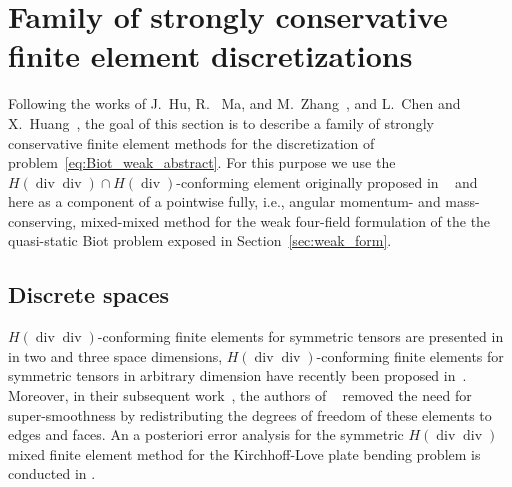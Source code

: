 \documentclass[11pt]{amsart}
\theoremstyle{remark}
\theoremstyle{definition}
\renewcommand{\div}{\operatorname{div}}
\renewcommand{\div}{\operatorname{div}}
\begin{document}
\section{Family of strongly conservative finite element discretizations}\label{sec:fem} 
Following the works of J.~Hu, R.~ Ma, and M.~Zhang~\cite{HuMaZhang2021}, and L.~Chen and X.~Huang~\cite{ChenHuang2022}, the goal of this section is to describe a family of strongly
conservative finite element methods for the discretization of problem~\eqref{eq:Biot_weak_abstract}.
For this purpose we use the $H(\div \div) \cap H(\div)$-conforming element originally proposed in ~\cite{HuMaZhang2021}
and ~\cite{ChenHuang2022} here as a component of a pointwise fully, i.e., angular momentum- and mass-conserving,
mixed-mixed method for the weak four-field formulation of the the quasi-static Biot problem exposed in Section~\ref{sec:weak_form}.

\subsection{Discrete spaces}\label{subsec:discret_spaces} 
$H(\div\div)$-conforming finite elements for symmetric tensors are presented in~\cite{chen2020finite, HuMaZhang2021, chen2022finite} in two and three space dimensions, $H(\div \div)$-conforming finite elements for symmetric tensors in arbitrary dimension have recently been proposed in~\cite{ChenHuang2022}. 
Moreover, in their subsequent work~\cite{chen2025new}, the authors of  ~\cite{ChenHuang2022} removed the need for super-smoothness
by redistributing the degrees of freedom of these elements to edges and faces. An a posteriori error analysis for the
symmetric $H(\div\div)$ mixed finite element method for the Kirchhoff-Love plate bending problem is conducted in \cite{hu2025optimality}. 
\end{document}
